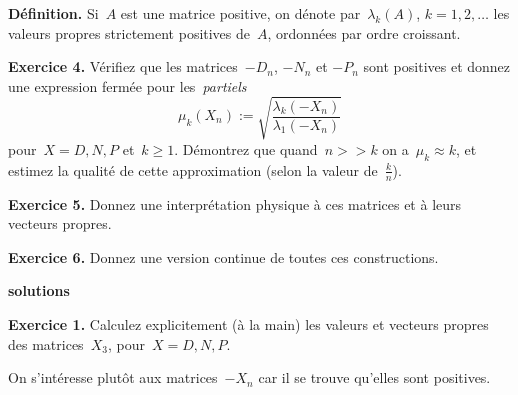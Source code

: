 {\bf Définition.}
Si~$A$ est une matrice positive, on dénote par~$\lambda_k(A)$, $k=1,2,\ldots$
les valeurs propres strictement positives de~$A$, ordonnées par ordre croissant.

{\bf Exercice 4.}
Vérifiez que les matrices~$-D_n$, $-N_n$ et $-P_n$ sont positives et donnez une
expression fermée pour les~\emph{partiels}
\[
	\mu_k(X_n) := \sqrt{\frac{\lambda_k(-X_n)}{\lambda_1(-X_n)}}
\]
pour~$X=D,N,P$ et~$k\ge 1$.  Démontrez que quand~$n>>k$ on a~$\mu_k\approx k$,
et estimez la qualité de cette approximation (selon la valeur de~$\tfrac kn$).

{\bf Exercice 5.}
Donnez une interprétation physique à ces matrices et à leurs vecteurs propres.

{\bf Exercice 6.}
Donnez une version continue de toutes ces constructions.

\clearpage
{\bf\large solutions}


{\color{blue}
{\bf Exercice 1.}
Calculez explicitement (à la main) les valeurs et vecteurs propres des
matrices~$X_3$, pour~$X=D,N,P$.
}

On s'intéresse plutôt aux matrices~$-X_n$ car il se trouve qu'elles sont
positives.


